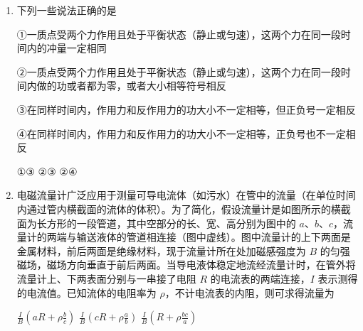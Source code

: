 \documentclass[\gkver]{gaokaozhenti}
\begin{document}
\begin{enumerate}
\item
下列一些说法正确的是

①一质点受两个力作用且处于平衡状态（静止或匀速），这两个力在同一段时间内的冲量一定相同

②一质点受两个力作用且处于平衡状态（静止或匀速），这两个力在同一段时间内做的功或者都为零，或者大小相等符号相反

③在同样时间内，作用力和反作用力的功大小不一定相等，但正负号一定相反

④在同样时间内，作用力和反作用力的功大小不一定相等，正负号也不一定相反

{①③}
{②③}
{②④}


\item
电磁流量计广泛应用于测量可导电流体（如污水）在管中的流量（在单位时间内通过管内横截面的流体的体积）。为了简化，假设流量计是如图所示的横截面为长方形的一段管道，其中空部分的长、宽、高分别为图中的 $a$、$b$、$c$，流量计的两端与输送液体的管道相连接（图中虚线）。图中流量计的上下两面是金属材料，前后两面是绝缘材料，现于流量计所在处加磁感强度为 $B$ 的匀强磁场，磁场方向垂直于前后两面。当导电液体稳定地流经流量计时，在管外将流量计上、下两表面分别与一串接了电阻 $R$ 的电流表的两端连接，$I$ 表示测得的电流值。已知流体的电阻率为 $\rho$，不计电流表的内阻，则可求得流量为

\onepicture[w=6.00cm]{}

{$\frac{I}{B}(aR+\rho\frac{b}{c})$}
{$\frac{I}{B}(cR+\rho\frac{a}{b})$}
{$\frac{I}{B}(R+\rho\frac{bc}{a})$}



\end{enumerate}
\end{document}
